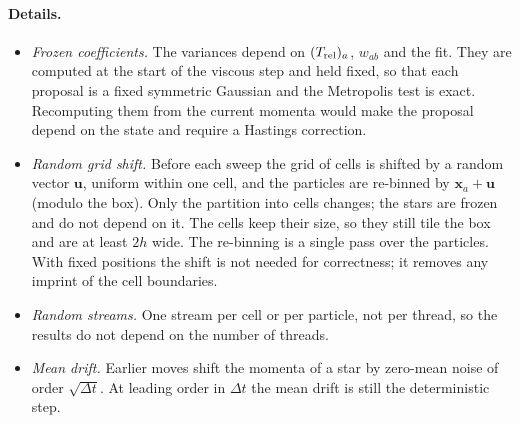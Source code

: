 \documentclass[11pt,aps,preprint,nofootinbib,superscriptaddress,tightenlines]{revtex4-2}
\let\oldparagraph\paragraph
\renewcommand{\paragraph}{\par\bigskip\oldparagraph}
\begin{document}
\paragraph{Details.}
\begin{itemize}
\item \emph{Frozen coefficients.}  The variances depend on $(T_{\rm rel})_a$, $w_{ab}$ and the
  fit.  They are computed at the start of the viscous step and held fixed, so
  that each proposal is a fixed symmetric Gaussian and the Metropolis test is
  exact.  Recomputing them from the current momenta would make the proposal
  depend on the state and require a Hastings correction.
\item \emph{Random grid shift.}  Before each sweep the grid of cells is shifted
  by a random vector $\bm u$, uniform within one cell, and the particles are
  re-binned by $\bm x_a+\bm u$ (modulo the box).  Only the partition into cells
  changes; the stars are frozen and do not depend on it.  The cells keep their
  size, so they still tile the box and are at least $2h$ wide.  The re-binning
  is a single pass over the particles.  With fixed positions the shift is not
  needed for correctness; it removes any imprint of the cell boundaries.
\item \emph{Random streams.}  One stream per cell or per particle, not per
  thread, so the results do not depend on the number of threads.
\item \emph{Mean drift.}  Earlier moves shift the momenta of a star by
  zero-mean noise of order $\sqrt{\Delta t}$.  At leading order in $\Delta t$ the
  mean drift is still the deterministic step.
\end{itemize}
\end{document}
